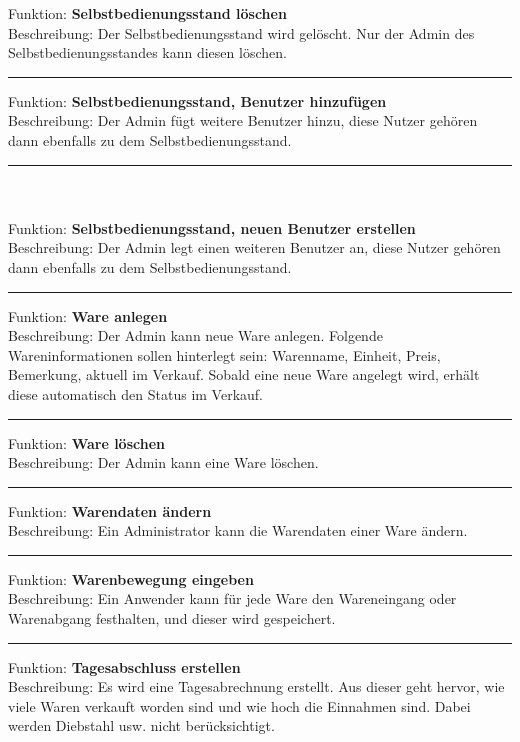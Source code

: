 Funktion: \textbf{Selbstbedienungsstand löschen}\\
Beschreibung: Der Selbstbedienungsstand wird gelöscht. Nur der Admin des Selbstbedienungsstandes kann diesen löschen.


\noindent\rule{\textwidth}{1pt}

Funktion: \textbf{Selbstbedienungsstand, Benutzer hinzufügen}\\
Beschreibung: Der Admin fügt weitere Benutzer hinzu, diese Nutzer gehören dann ebenfalls zu dem Selbstbedienungsstand. 

\noindent\rule{\textwidth}{1pt}
\\
\\
Funktion: \textbf{Selbstbedienungsstand, neuen Benutzer erstellen}\\
Beschreibung: Der Admin legt einen weiteren Benutzer an, diese Nutzer gehören dann ebenfalls zu dem Selbstbedienungsstand. 


\noindent\rule{\textwidth}{1pt}

Funktion: \textbf{Ware anlegen}\\
Beschreibung: Der Admin kann neue Ware anlegen. Folgende Wareninformationen sollen hinterlegt sein: Warenname, Einheit, Preis, Bemerkung, aktuell im Verkauf. 
Sobald eine neue Ware angelegt wird, erhält diese automatisch den Status im Verkauf.


\noindent\rule{\textwidth}{1pt}

Funktion: \textbf{Ware löschen}\\
Beschreibung: Der Admin kann eine Ware löschen. 


\noindent\rule{\textwidth}{1pt}

Funktion: \textbf{Warendaten ändern}\\
Beschreibung: Ein Administrator kann die Warendaten einer Ware ändern.

\noindent\rule{\textwidth}{1pt}


Funktion: \textbf{Warenbewegung eingeben}\\
Beschreibung: Ein Anwender kann für jede Ware den Wareneingang oder Warenabgang festhalten, und dieser wird gespeichert.

\noindent\rule{\textwidth}{1pt}


Funktion: \textbf{Tagesabschluss erstellen}\\
Beschreibung: Es wird eine Tagesabrechnung erstellt. Aus dieser geht hervor, wie viele Waren verkauft worden sind und wie hoch die Einnahmen sind. Dabei werden Diebstahl usw. nicht berücksichtigt.



